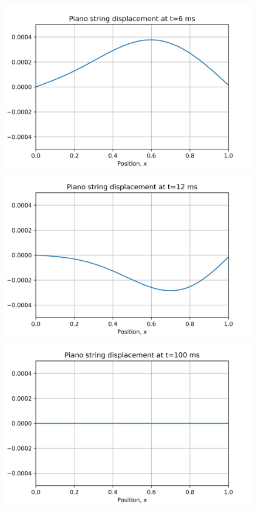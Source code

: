\documentclass{article}
\begin{document}
\begin{figure}[H]
\begin{minipage}[b]{0.33\linewidth}
    	\includegraphics[width=1.0\linewidth]{../images/wave_eqtn_6ms.png}
  	\end{minipage}
  	\begin{minipage}[b]{0.33\linewidth}
    	\includegraphics[width=1.0\linewidth]{../images/wave_eqtn_12ms.png} 
  	\end{minipage}
  	\begin{minipage}[b]{0.33\linewidth}
  		\includegraphics[width=1.0\linewidth]{../images/wave_eqtn_100ms.png}

\end{minipage}
\end{figure}
\end{document}
